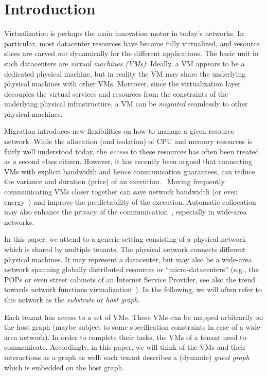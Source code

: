 \documentclass[conference]{IEEEtran}
\begin{document}
\renewcommand{\baselinestretch}{.91}

\section{Introduction}

Virtualization is perhaps the main innovation motor in today's networks. In particular, most datacenter resources have
become fully virtualized, and resource slices are carved out dynamically for the different applications.
The basic unit in such datacenters are \emph{virtual machines (VMs)}: Ideally, a VM appears to be a dedicated physical machine,
but in reality the VM may share the underlying physical machines with other VMs. Moreover, since the virtualization layer decouples
the virtual services and resources from the constraints of the underlying physical infrastructure, a VM can be \emph{migrated}
seamlessly to other physical machines.

Migration introduces new flexibilities on how to manage a given resource network. While the allocation (and isolation)
of CPU and memory resources is fairly well understood today, the \emph{access} to these resources
has often been treated as a second class citizen. However, it has recently been argued that connecting VMs with explicit bandwidth and hence communication guarantees,
 can reduce the variance and duration (price) of an execution.~\cite{mesos,talk-about,qclouds,amazon-per,EC2over}
Moving frequently communicating VMs closer together can save network bandwidth (or even energy~\cite{Shang2010Energy-aware}) and improve the predictability of the execution. Automatic collocation may also enhance the privacy of the communication~\cite{getoff}, especially in wide-area networks.

In this paper, we attend to a generic setting consisting of a physical network which is shared by multiple tenants.
The physical network connects different physical machines. It may represent a datacenter, but may also be
a wide-area network spanning globally distributed resources or ``micro-datacenters'' (e.g., the POPs or even street cabinets
of an Internet Service Provider, see also the trend towards network functions virtualization~\cite{nfv}). In the following, we will often refer to this network as the \emph{substrate} or \emph{host graph}.

Each tenant has access to a set of VMs. These VMs can be mapped arbitrarily on the host graph (maybe subject to some specification constraints
in case of a wide-area network). In order to complete their tasks, the VMs of a tenant need to communicate. Accordingly, in this paper,
we will think of the VMs and their interactions as a graph as well: each tenant describes a
(dynamic) \emph{guest graph} which is embedded on the host graph.
\end{document}
